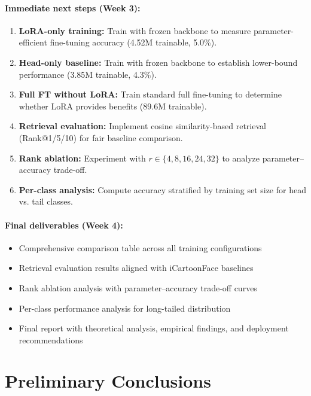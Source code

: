 \documentclass[11pt]{article}
\begin{document}
\paragraph{Immediate next steps (Week 3):}
\begin{enumerate}
    \item \textbf{LoRA-only training:} Train with frozen backbone to measure parameter-efficient fine-tuning accuracy (4.52M trainable, 5.0\%).

    \item \textbf{Head-only baseline:} Train with frozen backbone to establish lower-bound performance (3.85M trainable, 4.3\%).

    \item \textbf{Full FT without LoRA:} Train standard full fine-tuning to determine whether LoRA provides benefits (89.6M trainable).

    \item \textbf{Retrieval evaluation:} Implement cosine similarity-based retrieval (Rank@1/5/10) for fair baseline comparison.

    \item \textbf{Rank ablation:} Experiment with $r \in \{4, 8, 16, 24, 32\}$ to analyze parameter--accuracy trade-off.

    \item \textbf{Per-class analysis:} Compute accuracy stratified by training set size for head vs. tail classes.
\end{enumerate}

\paragraph{Final deliverables (Week 4):}
\begin{itemize}
    \item Comprehensive comparison table across all training configurations
    \item Retrieval evaluation results aligned with iCartoonFace baselines
    \item Rank ablation analysis with parameter--accuracy trade-off curves
    \item Per-class performance analysis for long-tailed distribution
    \item Final report with theoretical analysis, empirical findings, and deployment recommendations
\end{itemize}

\section{Preliminary Conclusions}
\end{document}
